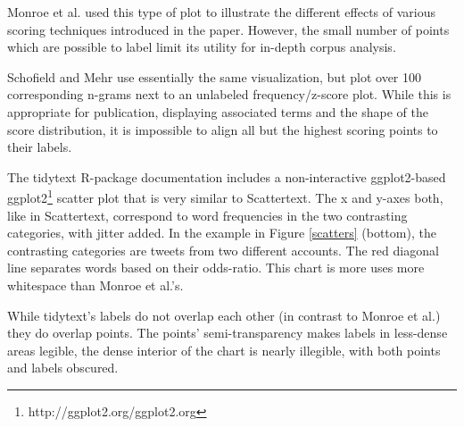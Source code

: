 \documentclass[11pt,a4paper]{article}
\begin{document}
Monroe et al.  used this type of plot to illustrate the different effects of various scoring techniques introduced in the paper.  However, the small number of points which are possible to label limit its utility for in-depth corpus analysis.  

Schofield and Mehr  use essentially the same visualization, but plot over 100 corresponding n-grams next to an unlabeled frequency/z-score plot.  While this is appropriate for publication, displaying associated terms and the shape of the score distribution, it is impossible to align all but the highest scoring points to their labels. 

The tidytext R-package \cite{tidytext} documentation includes a non-interactive ggplot2-based ggplot2\footnote{{http://ggplot2.org/}{ggplot2.org}} scatter plot that is very similar to Scattertext.   The x and y-axes both, like in Scattertext, correspond to word frequencies in the two contrasting categories, with jitter added.   In the example in Figure \ref{scatters} (bottom), the contrasting categories are tweets from two different accounts.  The red diagonal line separates words based on their odds-ratio.  This chart is more uses more whitespace than Monroe et al.'s.

While tidytext's labels do not overlap each other (in contrast to Monroe et al.) they do overlap points.  The points' semi-transparency makes labels in less-dense areas legible, the dense interior of the chart is nearly illegible, with both points and labels obscured. 
\end{document}
